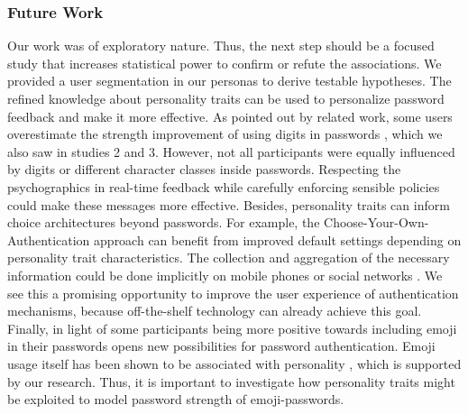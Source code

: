 \subsubsection{Future Work}
Our work was of exploratory nature. Thus, the next step should be a focused study that increases statistical power to confirm or refute the associations. We provided a user segmentation in our personas to derive testable hypotheses. The refined knowledge about personality traits can be used to personalize password feedback and make it more effective. As pointed out by related work, some users overestimate the strength improvement of using digits in passwords \cite{Ur2016PerceptionsPassword}, which we also saw in studies 2 and 3. However, not all participants were equally influenced by digits or different character classes inside passwords. Respecting the psychographics in real-time feedback while carefully enforcing sensible policies could make these messages more effective. Besides, personality traits can inform choice architectures beyond passwords. For example, the Choose-Your-Own-Authentication approach \cite{Forget2015CYOA} can benefit from improved default settings depending on personality trait characteristics. The collection and aggregation of the necessary information could be done implicitly on mobile phones or social networks \cite{DeMontjoye2013, Stachl2017PersonalitySmartphones, Youyou2015Personality}. We see this a promising opportunity to improve the user experience of authentication mechanisms, because off-the-shelf technology can already achieve this goal. Finally, in light of some participants being more positive towards including emoji in their passwords opens new possibilities for password authentication. Emoji usage itself has been shown to be associated with personality \cite{Marengo2017EmojiPersonality}, which is supported by our research. Thus, it is important to investigate how personality traits might be exploited to model password strength of emoji-passwords. 


